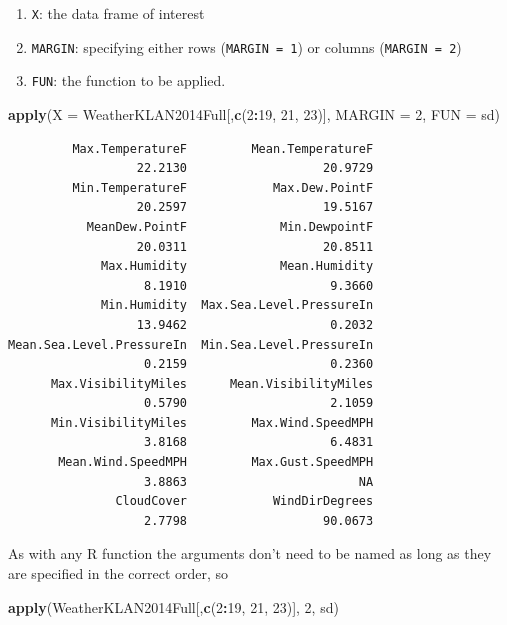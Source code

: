 \documentclass[
]{krantz}
\makeatletter
\newenvironment{Shaded}{\begin{snugshade}}{\end{snugshade}}
\newcommand{\DataTypeTok}[1]{\textcolor[rgb]{0.27,0.27,0.27}{#1}}
\newcommand{\DecValTok}[1]{\textcolor[rgb]{0.06,0.06,0.06}{#1}}
\newcommand{\KeywordTok}[1]{\textcolor[rgb]{0.27,0.27,0.27}{\textbf{#1}}}
\newcommand{\NormalTok}[1]{#1}
\newcommand{\OperatorTok}[1]{\textcolor[rgb]{0.43,0.43,0.43}{\textbf{#1}}}
\providecommand{\tightlist}{%
  \setlength{\itemsep}{0pt}\setlength{\parskip}{0pt}}
\newenvironment{kframe}{%
\medskip{}
\setlength{\fboxsep}{.8em}
 \def\at@end@of@kframe{}%
 \ifinner\ifhmode%
  \def\at@end@of@kframe{\end{minipage}}%
  \begin{minipage}{\columnwidth}%
 \fi\fi%
 \def\FrameCommand##1{\hskip\@totalleftmargin \hskip-\fboxsep
 \colorbox{shadecolor}{##1}\hskip-\fboxsep
     \hskip-\linewidth \hskip-\@totalleftmargin \hskip\columnwidth}%
 \MakeFramed {\advance\hsize-\width
   \@totalleftmargin\z@ \linewidth\hsize
   \@setminipage}}%
 {\par\unskip\endMakeFramed%
 \at@end@of@kframe}
\renewenvironment{Shaded}{\begin{kframe}}{\end{kframe}}
\makeatother
\begin{document}
\begin{enumerate}
\def\labelenumi{\arabic{enumi}.}
\tightlist
\item
  \texttt{X}: the data frame of interest
\item
  \texttt{MARGIN}: specifying either rows (\texttt{MARGIN\ =\ 1}) or columns (\texttt{MARGIN\ =\ 2})
\item
  \texttt{FUN}: the function to be applied.
\end{enumerate}

\begin{Shaded}
\begin{Highlighting}[]
\KeywordTok{apply}\NormalTok{(}\DataTypeTok{X =}\NormalTok{ WeatherKLAN2014Full[,}\KeywordTok{c}\NormalTok{(}\DecValTok{2}\OperatorTok{:}\DecValTok{19}\NormalTok{, }\DecValTok{21}\NormalTok{, }\DecValTok{23}\NormalTok{)], }\DataTypeTok{MARGIN =} \DecValTok{2}\NormalTok{, }\DataTypeTok{FUN =}\NormalTok{ sd)}
\end{Highlighting}
\end{Shaded}

\begin{verbatim}
         Max.TemperatureF         Mean.TemperatureF 
                  22.2130                   20.9729 
         Min.TemperatureF            Max.Dew.PointF 
                  20.2597                   19.5167 
           MeanDew.PointF             Min.DewpointF 
                  20.0311                   20.8511 
             Max.Humidity             Mean.Humidity 
                   8.1910                    9.3660 
             Min.Humidity  Max.Sea.Level.PressureIn 
                  13.9462                    0.2032 
Mean.Sea.Level.PressureIn  Min.Sea.Level.PressureIn 
                   0.2159                    0.2360 
      Max.VisibilityMiles      Mean.VisibilityMiles 
                   0.5790                    2.1059 
      Min.VisibilityMiles         Max.Wind.SpeedMPH 
                   3.8168                    6.4831 
       Mean.Wind.SpeedMPH         Max.Gust.SpeedMPH 
                   3.8863                        NA 
               CloudCover            WindDirDegrees 
                   2.7798                   90.0673 
\end{verbatim}

As with any R function the arguments don't need to be named as long as they are specified in the correct order, so

\begin{Shaded}
\begin{Highlighting}[]
\KeywordTok{apply}\NormalTok{(WeatherKLAN2014Full[,}\KeywordTok{c}\NormalTok{(}\DecValTok{2}\OperatorTok{:}\DecValTok{19}\NormalTok{, }\DecValTok{21}\NormalTok{, }\DecValTok{23}\NormalTok{)], }\DecValTok{2}\NormalTok{, sd)}
\end{Highlighting}
\end{Shaded}
\end{document}

